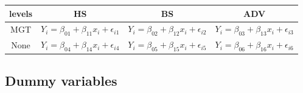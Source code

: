 \documentclass[]{book}
\theoremstyle{definition}
\theoremstyle{definition}
\theoremstyle{definition}
\theoremstyle{remark}
\begin{document}
\begin{longtable}[]{@{}cccc@{}}
\toprule
\begin{minipage}[b]{0.25\columnwidth}\centering
levels\strut
\end{minipage} & \begin{minipage}[b]{0.21\columnwidth}\centering
HS\strut
\end{minipage} & \begin{minipage}[b]{0.21\columnwidth}\centering
BS\strut
\end{minipage} & \begin{minipage}[b]{0.21\columnwidth}\centering
ADV\strut
\end{minipage}\tabularnewline
\midrule
\endhead
\begin{minipage}[t]{0.25\columnwidth}\centering
MGT\strut
\end{minipage} & \begin{minipage}[t]{0.21\columnwidth}\centering
\(Y_i = \beta_{01} + \beta_{11} x_i + \epsilon_{i1}\)\strut
\end{minipage} & \begin{minipage}[t]{0.21\columnwidth}\centering
\(Y_i = \beta_{02} + \beta_{12} x_i + \epsilon_{i2}\)\strut
\end{minipage} & \begin{minipage}[t]{0.21\columnwidth}\centering
\(Y_i = \beta_{03} + \beta_{13} x_i + \epsilon_{i3}\)\strut
\end{minipage}\tabularnewline
\begin{minipage}[t]{0.25\columnwidth}\centering
None\strut
\end{minipage} & \begin{minipage}[t]{0.21\columnwidth}\centering
\(Y_i = \beta_{04} + \beta_{14} x_i + \epsilon_{i4}\)\strut
\end{minipage} & \begin{minipage}[t]{0.21\columnwidth}\centering
\(Y_i = \beta_{05} + \beta_{15} x_i + \epsilon_{i5}\)\strut
\end{minipage} & \begin{minipage}[t]{0.21\columnwidth}\centering
\(Y_i = \beta_{06} + \beta_{16} x_i + \epsilon_{i6}\)\strut
\end{minipage}\tabularnewline
\bottomrule
\end{longtable}

\hypertarget{moddummy1}{%
\subsection{Dummy variables}\label{moddummy1}}
\end{document}
